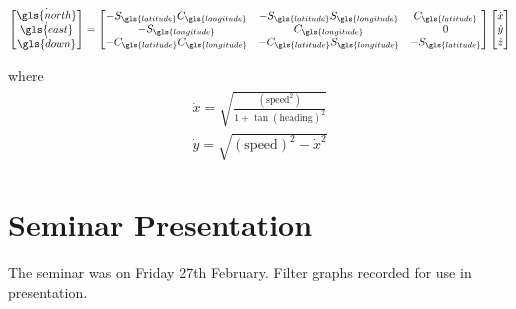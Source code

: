  \begin{equation}
 \begin{bmatrix}																
 \dot{\gls{north}  }       			\\
 \dot{\gls{east}} 	  \\
 \dot{\gls{down}}
 \end{bmatrix}
 =
 \begin{bmatrix}																
 -S_{\gls{latitude}}C_{\gls{longitude}}	& -S_{\gls{latitude}}S_{\gls{longitude}}	 & C_{\gls{latitude}}\\
 -S_{\gls{longitude}}		& C_{\gls{longitude}} & 0\\
 -C_{\gls{latitude}}C_{\gls{longitude}} 	& -C_{\gls{latitude}}S_{\gls{longitude}} & -S_{\gls{latitude}}
 \end{bmatrix}
 \begin{bmatrix}																
 \dot{x}  			\\
 \dot{y}   	  \\
 \dot{z} 
 \end{bmatrix} 
 \label{Eq: ecef frame mapping velocity}
 \end{equation}





where 
\begin{align}
\begin{split}
\dot{x} = \sqrt{\frac{(\mathrm{speed}^2)}{1 + \tan(\mathrm{heading})^2}}\\
\dot{y} = \sqrt{(\mathrm{speed})^2 - \dot{x}^2}
\end{split}
\end{align}

 \tocless\section{Seminar Presentation}
The seminar was on Friday 27th February. Filter graphs recorded for use in presentation.












